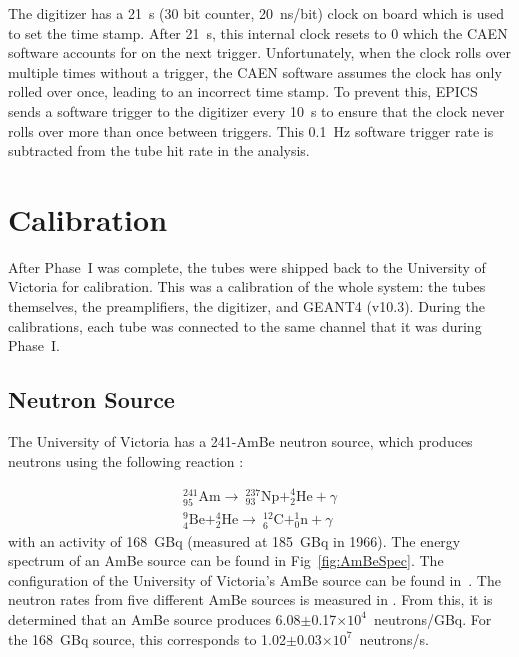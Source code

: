 	The digitizer has a 21~s (30 bit counter, 20~ns/bit) clock on board which is used to set the time stamp. After 21~s, this internal clock resets to 0 which the CAEN software accounts for on the next trigger. Unfortunately, when the clock rolls over multiple times without a trigger, the CAEN software assumes the clock has only rolled over once, leading to an incorrect time stamp. To prevent this, EPICS sends a software trigger to the digitizer every 10~s to ensure that the clock never rolls over more than once between triggers. This 0.1~Hz software trigger rate is subtracted from the \he tube hit rate in the analysis.



\section{Calibration}

After Phase~I was complete, the \he tubes were shipped back to the University of Victoria for calibration. This was a calibration of the whole system: the tubes themselves, the preamplifiers, the digitizer, and GEANT4 (v10.3). During the calibrations, each tube was connected to the same channel that it was during Phase~I.

\subsection{Neutron Source}
\label{sec:AmBe}
	The University of Victoria has a 241-AmBe neutron source, which produces neutrons using the following reaction \cite{barschall1983neutron}:

\begin{subequations}
\begin{align}
		{^{241}_{95}\mathrm{Am}\rightarrow~^{237}_{93}\mathrm{Np} + ^4_2\mathrm{He} + \gamma}\\
		{^9_4\mathrm{Be}+^4_2\mathrm{He}\rightarrow~^{12}_6\mathrm{C}+^1_0\mathrm{n}+\gamma}
\end{align}
\end{subequations}
with an activity of 168~GBq (measured at 185~GBq in 1966). The energy spectrum of an AmBe source can be found in Fig~\ref{fig:AmBeSpec}. The configuration of the University of Victoria's AmBe source can be found in~\cite{hargrove}. The neutron rates from five different AmBe sources is measured in \cite{lebreton2007experimental}. From this, it is determined that an AmBe source produces 6.08$\pm$0.17$\times10^{4}$~neutrons/GBq. For the 168~GBq source, this corresponds to 1.02$\pm$0.03$\times10^{7}$~neutrons/s.

